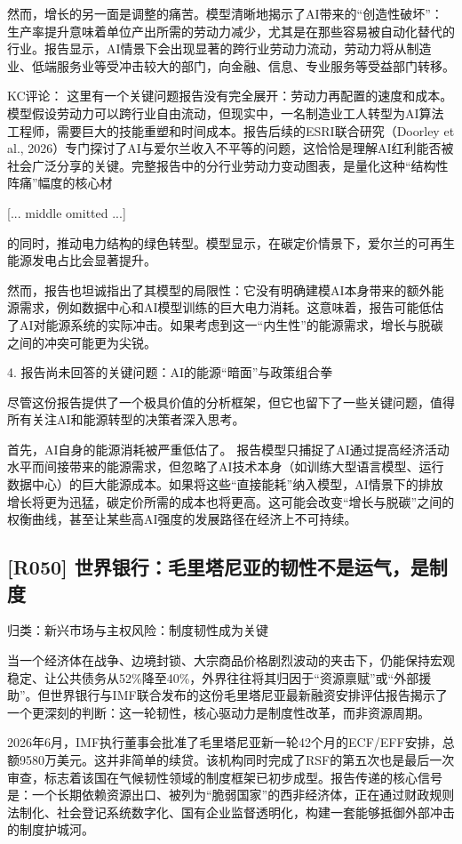 \documentclass[11pt]{ctexart}
\begin{document}
然而，增长的另一面是调整的痛苦。模型清晰地揭示了AI带来的“创造性破坏”：生产率提升意味着单位产出所需的劳动力减少，尤其是在那些容易被自动化替代的行业。报告显示，AI情景下会出现显著的跨行业劳动力流动，劳动力将从制造业、低端服务业等受冲击较大的部门，向金融、信息、专业服务等受益部门转移。

KC评论： 这里有一个关键问题报告没有完全展开：劳动力再配置的速度和成本。模型假设劳动力可以跨行业自由流动，但现实中，一名制造业工人转型为AI算法工程师，需要巨大的技能重塑和时间成本。报告后续的ESRI联合研究（Doorley et al., 2026）专门探讨了AI与爱尔兰收入不平等的问题，这恰恰是理解AI红利能否被社会广泛分享的关键。完整报告中的分行业劳动力变动图表，是量化这种“结构性阵痛”幅度的核心材

[... middle omitted ...]

的同时，推动电力结构的绿色转型。模型显示，在碳定价情景下，爱尔兰的可再生能源发电占比会显著提升。

然而，报告也坦诚指出了其模型的局限性：它没有明确建模AI本身带来的额外能源需求，例如数据中心和AI模型训练的巨大电力消耗。这意味着，报告可能低估了AI对能源系统的实际冲击。如果考虑到这一“内生性”的能源需求，增长与脱碳之间的冲突可能更为尖锐。

4. 报告尚未回答的关键问题：AI的能源“暗面”与政策组合拳

尽管这份报告提供了一个极具价值的分析框架，但它也留下了一些关键问题，值得所有关注AI和能源转型的决策者深入思考。

首先，AI自身的能源消耗被严重低估了。 报告模型只捕捉了AI通过提高经济活动水平而间接带来的能源需求，但忽略了AI技术本身（如训练大型语言模型、运行数据中心）的巨大能源成本。如果将这些“直接能耗”纳入模型，AI情景下的排放增长将更为迅猛，碳定价所需的成本也将更高。这可能会改变“增长与脱碳”之间的权衡曲线，甚至让某些高AI强度的发展路径在经济上不可持续。

\subsection{[R050] 世界银行：毛里塔尼亚的韧性不是运气，是制度}
{\small\color{refgray}归类：新兴市场与主权风险：制度韧性成为关键}

当一个经济体在战争、边境封锁、大宗商品价格剧烈波动的夹击下，仍能保持宏观稳定、让公共债务从52\%降至40\%，外界往往将其归因于“资源禀赋”或“外部援助”。但世界银行与IMF联合发布的这份毛里塔尼亚最新融资安排评估报告揭示了一个更深刻的判断：这一轮韧性，核心驱动力是制度性改革，而非资源周期。

2026年6月，IMF执行董事会批准了毛里塔尼亚新一轮42个月的ECF/EFF安排，总额9580万美元。这并非简单的续贷。该机构同时完成了RSF的第五次也是最后一次审查，标志着该国在气候韧性领域的制度框架已初步成型。报告传递的核心信号是：一个长期依赖资源出口、被列为“脆弱国家”的西非经济体，正在通过财政规则法制化、社会登记系统数字化、国有企业监督透明化，构建一套能够抵御外部冲击的制度护城河。
\end{document}

